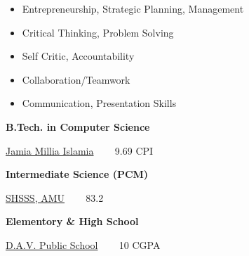 \documentclass[10pt,a4paper,ragged2e,withhyper]{altacv}
\begin{document}
\begin{paracol}{2}
\begin{itemize}
    \item {Entrepreneurship}, {Strategic Planning}, {Management}
    \item {Critical Thinking}, {Problem Solving}
    \item {Self Critic}, {Accountability}
    \item {Collaboration/Teamwork}
    \item {Communication}, {Presentation Skills}
\end{itemize}


\textbf{B.Tech. in Computer Science}

\textcolor{VividPurple}{\href{https://www.jmi.ac.in}{Jamia Millia Islamia}} ~~~ 9.69 CPI

\textbf{Intermediate Science (PCM)}

\textcolor{VividPurple}{\href{https://www.amu.ac.in/schools/saiyyid-hamid-senior-secondary-school-boys/home-page}{SHSSS, AMU}} ~~~ 83.2%

\textbf{Elementory \& High School}

\textcolor{VividPurple}{\href{http://davntpc.org}{D.A.V. Public School}} ~~~ 10 CGPA

\end{paracol}
\end{document}
